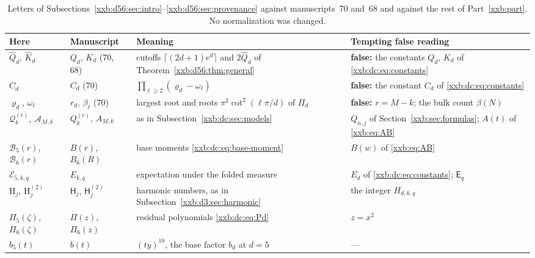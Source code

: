 \documentclass[11pt,a4paper]{article}
\numberwithin{equation}{section}
\theoremstyle{definition}
\theoremstyle{remark}
\theoremstyle{plain}
\begin{document}
\begingroup
\renewcommand{\thetable}{\thesection.A}%
\renewcommand{\theHtable}{xxb.d56.\thesection.A}%
\begin{table}[!htbp]
\centering\small
\caption{Letters of
Subsections~\ref{xxb:d56:sec:intro}--\ref{xxb:d56:sec:provenance} against
manuscripts~70 and~68 and against the rest of Part~\ref{xxb:part}.  No
normalization was changed.}\label{xxb:d56:tab:notation}
\begin{tabular}{@{}>{\raggedright\arraybackslash}p{}
 >{\raggedright\arraybackslash}p{}
 >{\raggedright\arraybackslash}p{}
 >{\raggedright\arraybackslash}p{}@{}}
\toprule
Here & Manuscript & Meaning & Tempting false reading\\
\midrule
$\widehat Q_d$, $\widehat K_d$ & $Q_d$, $K_d$ (70, 68) & cutoffs $\lceil(2d+1)e^d\rceil$ and $2\widehat Q_d$ of Theorem~\ref{xxb:d56:thm:general} &
 \textbf{false:} the constants $Q_d$, $K_d$ of \eqref{xxb:dc:eq:constants}\\
$\widehat C_d$ & $C_d$ (70) & $\prod_{\ell\ge2}(\varrho_d-\omega_\ell)$ &
 \textbf{false:} the constant $C_d$ of \eqref{xxb:dc:eq:constants}\\
$\varrho_d$, $\omega_\ell$ & $r_d$, $\beta_\ell$ (70) & largest root and roots $\pi^2\cot^2(\ell\pi/d)$ of $\Pi_d$ &
 \textbf{false:} $r=M-k$; the bulk count $\beta(N)$\\
\midrule
$\mathcal Q_k^{(r)}$, $\mathcal A_{M,k}$ & $Q_k^{(r)}$, $A_{M,k}$ & as in Subsection~\ref{xxb:dc:sec:models} &
 $Q_{n,j}$ of Section~\ref{xxb:sec:formulas}; $A(t)$ of \eqref{xxb:eq:AB}\\
$\mathcal B_5(r)$, $\mathcal B_6(r)$ & $B(r)$, $B_6(R)$ & base moments \eqref{xxb:dc:eq:base-moment} & $B(w)$ of \eqref{xxb:eq:AB}\\
$\mathcal E_{5,k,q}$ & $E_{k,q}$ & expectation under the folded measure & $E_d$ of \eqref{xxb:dc:eq:constants}; $\mathsf E_q$\\
$\mathrm H_j$, $\mathrm H_j^{(2)}$ & $\mathsf H_j$, $\mathsf H_j^{(2)}$ & harmonic numbers, as in Subsection~\ref{xxb:d3:sec:harmonic} & the integer $H_{d,k,q}$\\
$\Pi_5(\zeta)$, $\Pi_6(\zeta)$ & $\Pi(z)$, $\Pi_6(z)$ & residual polynomials \eqref{xxb:dc:eq:Pd} & $z=x^2$\\
$b_5(t)$ & $b(t)$ & $(ty)^{10}$, the base factor $b_d$ at $d=5$ & ---\\

\end{tabular}
\end{table}
\end{document}
